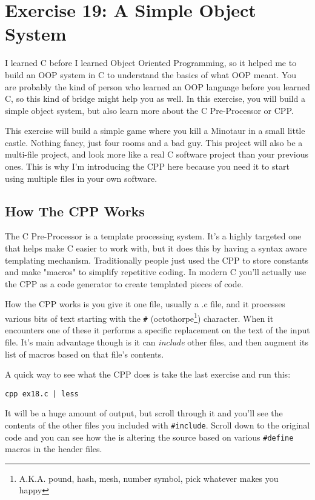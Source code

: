 \chapter{Exercise 19: A Simple Object System}

I learned C before I learned Object Oriented Programming, so it helped me to
build an OOP system in C to understand the basics of what OOP meant.  You are
probably the kind of person who learned an OOP language before you learned C,
so this kind of bridge might help you as well.  In this exercise, you will
build a simple object system, but also learn more about the C Pre-Processor or
CPP.

This exercise will build a simple game where you kill a Minotaur in a small
little castle.  Nothing fancy, just four rooms and a bad guy.  This project
will also be a multi-file project, and look more like a real C software 
project than your previous ones.  This is why I'm introducing the CPP here
because you need it to start using multiple files in your own software.

\section{How The CPP Works}

The C Pre-Processor is a template processing system.  It's a highly
targeted one that helps make C easier to work with, but it does
this by having a syntax aware templating mechanism.  Traditionally
people just used the CPP to store constants and make "macros" to simplify
repetitive coding.  In modern C you'll actually use the CPP as a code
generator to create templated pieces of code.

How the CPP works is you give it one file, usually a .c file, and it
processes various bits of text starting with the \verb|#| (octothorpe\footnote{A.K.A. pound, hash, mesh, number symbol, pick whatever makes you happy})
character.  When it encounters one of these it performs a specific replacement
on the text of the input file.  It's main advantage though is it can
\emph{include} other files, and then augment its list of macros
based on that file's contents.

A quick way to see what the CPP does is take the last exercise and 
run this: 

\begin{Verbatim}
cpp ex18.c | less
\end{Verbatim}

It will be a huge amount of output, but scroll through it and you'll see the
contents of the other files you included with \verb|#include|.  Scroll down
to the original code and you can see how the  is altering the
source based on various \verb|#define| macros in the header files.

